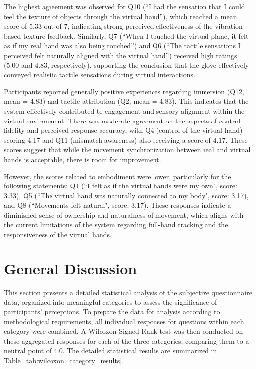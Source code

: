The highest agreement was observed for Q10 (``I had the sensation that I could feel the texture of objects through the virtual hand”), which reached a mean score of 5.33 out of 7, indicating strong perceived effectiveness of the vibration-based texture feedback. Similarly, Q7 (``When I touched the virtual plane, it felt as if my real hand was also being touched”) and Q6 (``The tactile sensations I perceived felt naturally aligned with the virtual hand”) received high ratings (5.00 and 4.83, respectively), supporting the conclusion that the glove effectively conveyed realistic tactile sensations during virtual interactions.

Participants reported generally positive experiences regarding immersion (Q12, mean = 4.83) and tactile attribution (Q2, mean = 4.83). This indicates that the system effectively contributed to engagement and sensory alignment within the virtual environment. There was moderate agreement on the aspects of control fidelity and perceived response accuracy, with Q4 (control of the virtual hand) scoring 4.17 and Q11 (mismatch awareness) also receiving a score of 4.17. These scores suggest that while the movement synchronization between real and virtual hands is acceptable, there is room for improvement.

However, the scores related to embodiment were lower, particularly for the following statements: Q1 (``I felt as if the virtual hands were my own",  score: 3.33), Q5 (``The virtual hand was naturally connected to my body",  score: 3.17), and Q8 (``Movements felt natural",  score: 3.17). These responses indicate a diminished sense of ownership and naturalness of movement, which aligns with the current limitations of the system regarding full-hand tracking and the responsiveness of the virtual hands.


\section{General Discussion}  

This section presents a detailed statistical analysis of the subjective questionnaire data, organized into meaningful categories to assess the significance of participants' perceptions. To prepare the data for analysis according to methodological requirements, all individual responses for questions within each category were combined. A Wilcoxon Signed-Rank test was then conducted on these aggregated responses for each of the three categories, comparing them to a neutral point of 4.0. The detailed statistical results are summarized in Table~\ref{tab:wilcoxon_category_results}.

